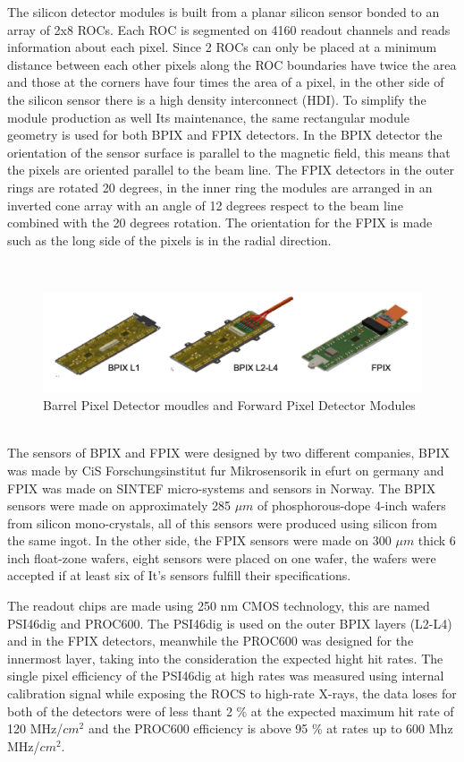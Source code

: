 The silicon detector modules is built from a planar silicon sensor bonded to an array of 2x8 ROCs. Each ROC is segmented on 4160 readout channels and reads information about each pixel. Since 2 ROCs can only be placed at a minimum distance between each other pixels along the ROC boundaries have twice the area and those at the corners have four times the area of a pixel, in the other side of the silicon sensor there is a high density interconnect (HDI). To simplify the module production as well Its maintenance, the same rectangular module geometry is used for both BPIX and FPIX detectors. In the BPIX detector the orientation of the sensor surface is parallel to the magnetic field, this means that the pixels are oriented parallel to the beam line. The FPIX detectors in the outer rings are rotated 20 degrees, in the inner ring the modules are arranged in an inverted cone array with an angle of 12 degrees respect to the beam line combined with the 20 degrees rotation. The orientation for the FPIX is made such as the long side of the pixels is in the radial direction.  

\\
\begin{figure}[h]
    \centering
    \includegraphics[width=1\textwidth]{BPIXFPIX.png}
    \caption{Barrel Pixel Detector moudles and Forward Pixel Detector Modules}
    \label{fig:BPIXFPIX}
\end{figure}

\\
The sensors of BPIX and FPIX were designed by two different companies, BPIX was made by CiS Forschungsinstitut fur Mikrosensorik in efurt on germany and FPIX was made on SINTEF micro-systems and sensors in Norway. The BPIX sensors were made on approximately 285 $\mu m$ of phosphorous-dope 4-inch wafers from silicon mono-crystals, all of this sensors were produced using silicon from the same ingot. In the other side, the FPIX sensors were made on 300 $\mu m$ thick 6 inch float-zone wafers, eight sensors were placed on one wafer, the wafers were accepted if at least six of It's sensors fulfill their specifications. 

The readout chips are made using 250 nm CMOS technology, this are named PSI46dig and PROC600. The PSI46dig is used on the outer BPIX layers (L2-L4) and in the FPIX detectors, meanwhile the PROC600 was designed for the innermost layer, taking into the consideration the expected hight hit rates. The single pixel efficiency of the PSI46dig at high rates was measured using internal calibration signal while exposing the ROCS to high-rate X-rays, the data loses for both of the detectors were of less thant 2 \% at the expected maximum hit rate of 120 MHz/$cm^{2}$ and the PROC600 efficiency is above 95 \% at rates up to 600 Mhz MHz/$cm^{2}$.

